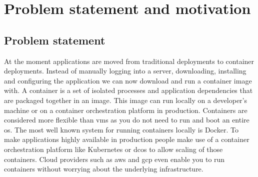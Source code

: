 \chapter{Problem statement and motivation}
\label{chap:problem}

\section{Problem statement}
\label{sec:problem-statement}
At the moment applications are moved from traditional deployments to container deployments. Instead of manually logging into a server, downloading, installing and configuring the application we can now download and run a container image with. A container is a set of isolated processes and application dependencies that are packaged together in an image. This image can run locally on a developer's machine or on a container orchestration platform in production. Containers are considered more flexible than \glspl{vm} as you do not need to run and boot an entire \gls{os}. The most well known system for running containers locally is Docker\cite{docker}. To make applications highly available in production people make use of a container orchestration platform like Kubernetes\cite{kubernetes} or \gls{dcos}\cite{dcos} to allow scaling of those containers. Cloud providers such as \gls{aws}\cite{aws} and \gls{gcp}\cite{gcp} even enable you to run containers without worrying about the underlying infrastructure.

